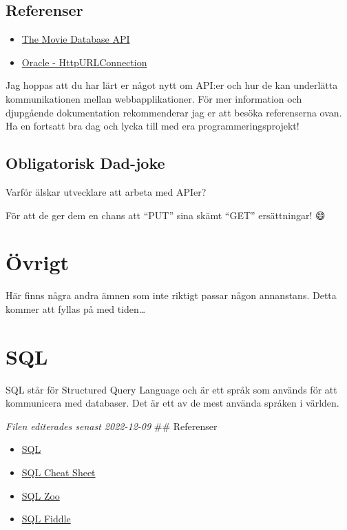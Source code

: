 \hypertarget{referenser}{%
\subsection{Referenser}\label{referenser}}

\begin{itemize}
\tightlist
\item
  \href{https://www.themoviedb.org/documentation/api}{The Movie Database
  API}
\item
  \href{https://docs.oracle.com/en/java/javase/11/docs/api/java.net/java/net/HttpURLConnection.html}{Oracle
  - HttpURLConnection}
\end{itemize}

Jag hoppas att du har lärt er något nytt om API:er och hur de kan
underlätta kommunikationen mellan webbapplikationer. För mer information
och djupgående dokumentation rekommenderar jag er att besöka
referenserna ovan. Ha en fortsatt bra dag och lycka till med era
programmeringsprojekt!

\hypertarget{obligatorisk-dad-joke}{%
\subsection{Obligatorisk Dad-joke}\label{obligatorisk-dad-joke}}

Varför älskar utvecklare att arbeta med APIer?

För att de ger dem en chans att ``PUT'' sina skämt ``GET'' ersättningar!
😄

\hypertarget{uxf6vrigt}{%
\section{Övrigt}\label{uxf6vrigt}}

Här finns några andra ämnen som inte riktigt passar någon annanstans.
Detta kommer att fyllas på med tiden\ldots{}

\hypertarget{sql}{%
\section{SQL}\label{sql}}

SQL står för Structured Query Language och är ett språk som används för
att kommunicera med databaser. Det är ett av de mest använda språken i
världen.

\emph{Filen editerades senast 2022-12-09} \#\# Referenser

\begin{itemize}
\tightlist
\item
  \href{https://www.w3schools.com/sql/default.asp}{SQL}
\item
  \href{https://www.w3schools.com/sql/sql_ref_mysql.asp}{SQL Cheat
  Sheet}
\item
  \href{https://sqlzoo.net/}{SQL Zoo}
\item
  \href{https://sqlfiddle.com/}{SQL Fiddle}
\end{itemize}

